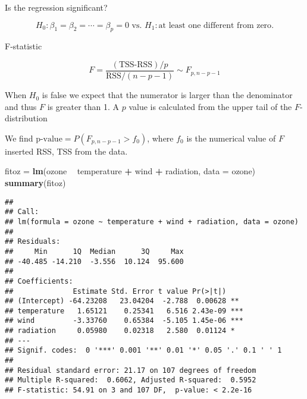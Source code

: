 \documentclass[ignorenonframetext,]{beamer}
\newenvironment{Shaded}{\begin{snugshade}}{\end{snugshade}}
\newcommand{\KeywordTok}[1]{\textcolor[rgb]{0.13,0.29,0.53}{\textbf{#1}}}
\newcommand{\DataTypeTok}[1]{\textcolor[rgb]{0.13,0.29,0.53}{#1}}
\newcommand{\StringTok}[1]{\textcolor[rgb]{0.31,0.60,0.02}{#1}}
\newcommand{\OperatorTok}[1]{\textcolor[rgb]{0.81,0.36,0.00}{\textbf{#1}}}
\newcommand{\NormalTok}[1]{#1}
\begin{document}
\begin{frame}

\begin{block}{Is the regression significant?}

\[ H_0: \beta_1=\beta_2=\cdots= \beta_p =0 \text{ vs. } H_1: \text{at least one different from zero}.\]

F-statistic

\[F=\frac{(\text{TSS-RSS})/p}{\text{RSS}/(n-p-1)} \sim F_{p,n-p-1}\]

When \(H_0\) is false we expect that the numerator is larger than the
denominator and thus \(F\) is greater than 1. A \(p\) value is
calculated from the upper tail of the \(F\)-distribution

We find \(\text{p-value}=P(F_{p,n-p-1}>f_0)\), where \(f_0\) is the
numerical value of \(F\) inserted RSS, TSS from the data.

\end{block}

\end{frame}

\begin{frame}[fragile]

\footnotesize

\begin{Shaded}
\begin{Highlighting}[]
\NormalTok{fitoz =}\StringTok{ }\KeywordTok{lm}\NormalTok{(ozone }\OperatorTok{~}\StringTok{ }\NormalTok{temperature }\OperatorTok{+}\StringTok{ }\NormalTok{wind }\OperatorTok{+}\StringTok{ }\NormalTok{radiation, }\DataTypeTok{data =}\NormalTok{ ozone)}
\KeywordTok{summary}\NormalTok{(fitoz)}
\end{Highlighting}
\end{Shaded}

\begin{verbatim}
## 
## Call:
## lm(formula = ozone ~ temperature + wind + radiation, data = ozone)
## 
## Residuals:
##     Min      1Q  Median      3Q     Max 
## -40.485 -14.210  -3.556  10.124  95.600 
## 
## Coefficients:
##              Estimate Std. Error t value Pr(>|t|)    
## (Intercept) -64.23208   23.04204  -2.788  0.00628 ** 
## temperature   1.65121    0.25341   6.516 2.43e-09 ***
## wind         -3.33760    0.65384  -5.105 1.45e-06 ***
## radiation     0.05980    0.02318   2.580  0.01124 *  
## ---
## Signif. codes:  0 '***' 0.001 '**' 0.01 '*' 0.05 '.' 0.1 ' ' 1
## 
## Residual standard error: 21.17 on 107 degrees of freedom
## Multiple R-squared:  0.6062, Adjusted R-squared:  0.5952 
## F-statistic: 54.91 on 3 and 107 DF,  p-value: < 2.2e-16
\end{verbatim}

\normalsize

\end{frame}
\end{document}
